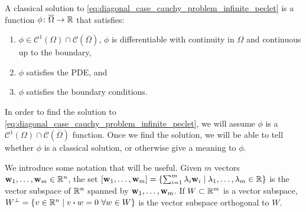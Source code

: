 \begin{definition}
	A classical solution to \eqref{eq:diagonal_case_cauchy_problem_infinite_peclet} is a function $\phi \colon \overline{\Omega} \rightarrow \mathbb{R}$ that satisfies:
	\begin{enumerate}[label={(\roman*)}, topsep=0pt]
		\item $\phi \in \mathcal{C}^1(\Omega) \cap \mathcal{C}(\overline{\Omega})$, \ie $\phi$ is differentiable with continuity in $\Omega$ and continuous up to the boundary,
		\item $\phi$ satisfies the PDE, and
		\item $\phi$ satisfies the boundary conditions.
	\end{enumerate}
\end{definition}
In order to find the solution to \eqref{eq:diagonal_case_cauchy_problem_infinite_peclet}, we will assume $\phi$ is a $\mathcal{C}^1(\Omega) \cap \mathcal{C}(\overline{\Omega})$ function. Once we find the solution, we will be able to tell whether $\phi$ is a classical solution, or otherwise give a meaning to $\phi$.

We introduce some notation that will be useful. Given $m$ vectors $\vb{w}_1, \ldots, \vb{w}_m \in \mathbb{R}^n$, the set $[\vb{w}_1, \ldots, \vb{w}_m] = \{ \sum_{i=1}^m \lambda_i \vb{w}_i \mid \lambda_1, \ldots, \lambda_m \in \mathbb{R} \}$ is the vector subspace of $\mathbb{R}^n$ spanned by $\vb{w}_1, \ldots, \vb{w}_m$. If $W \subset \mathbb{R}^m$ is a vector subspace, $W^\perp = \{ v \in \real^n \mid v \vdot w = 0 \ \forall w \in W \}$ is the vector subspace orthogonal to $W$.

